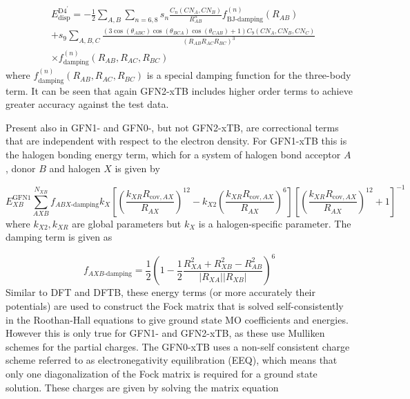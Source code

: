 \begin{equation}
    \begin{split}
    &E^{\text{D4}^{\prime}}_\text{disp} = -\frac{1}{2}\sum_{A,B}\sum_{n=6,8} s_n \frac{C_n\left(CN_A, CN_B\right)}{R^n_{AB}} f^{\left(n\right)}_{\text{BJ-damping}} \left(R_{AB}\right) \\
    & + s_9 \sum_{A,B,C} \frac{\left(3\cos\left(\theta_{ABC}\right)\cos\left(\theta_{BCA}\right)\cos\left(\theta_{CAB}\right)+1\right) C_9 \left(CN_A, CN_B, CN_C\right)}{\left(R_{AB}R_{AC}R_{BC}\right)^3} \\
    & \times f^{\left(n\right)}_{\text{damping}} \left(R_{AB}, R_{AC}, R_{BC}\right)
    \end{split}
\end{equation}
%
where $f^{\left(n\right)}_{\text{damping}} \left(R_{AB}, R_{AC}, R_{BC}\right)$ is
a special damping function for the three-body term. It can be seen that again GFN2-xTB 
includes higher order terms to achieve greater accuracy against the test data.

Present also in GFN1- and GFN0-, but not GFN2-xTB, are correctional terms that are
independent with respect to the electron density. For GFN1-xTB this is the halogen
bonding energy term, which for a system of halogen bond acceptor $A$, donor $B$ and
halogen $X$ is given by

\begin{equation}
    E_{XB}^{\text{GFN}1} \sum^{N_{XB}}_{AXB} f_{ABX\text{-damping}} k_X \left[ \left( \frac{k_{XR} R_{\text{cov}, AX}}{R_{AX}}\right)^{12} - k_{X2} \left(\frac{k_{XR} R_{\text{cov}, AX}}{R_{AX}}\right)^6 \right] \left[ \left( \frac{k_{XR} R_{\text{cov}, AX}}{R_{AX}}\right)^{12} + 1\right]^{-1}
\end{equation}
%
where $k_{X2}, k_{XR}$ are global parameters but $k_X$ is a halogen-specific parameter.
The damping term is given as

\begin{equation}
    f_{AXB\text{-damping}} = \frac{1}{2} \left(1 - \frac{1}{2} \frac{R^2_{XA} + R^2_{XB} - R^2_{AB}}{\left\lvert R_{XA} \right\rvert \left\lvert R_{XB} \right\rvert} \right) ^6
\end{equation}
%
Similar to DFT and DFTB, these energy terms (or more accurately their potentials)
are used to construct the Fock matrix that is solved self-consistently in the Roothan-Hall
equations to give ground state MO coefficients and energies. However this is only
true for GFN1- and GFN2-xTB, as these use Mulliken schemes for the partial charges.
The GFN0-xTB uses a non-self consistent charge scheme referred to as electronegativity
equilibration (EEQ), which means that only one diagonalization of the Fock matrix
is required for a ground state solution. These charges are given by solving the 
matrix equation


